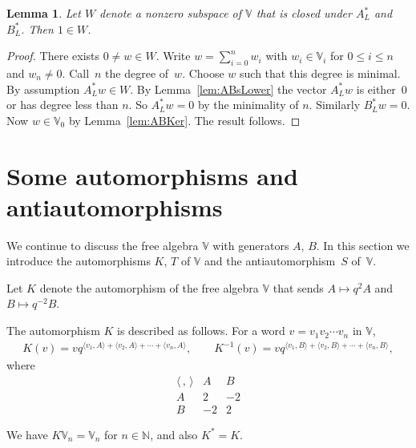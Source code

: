 \documentclass[11pt]{article}
\numberwithin{equation}{section}
\numberwithin{equation}{section}
\newtheorem{Lemma}[Theorem]{Lemma}
\begin{document}
{\begin{Lemma}\label{lem:ABirred}
Let $W$ denote a nonzero subspace of $\mathbb V$ that is closed under
$A^*_L$ and $B^*_L$. Then $1 \in W$.
\end{Lemma}
\begin{proof} There exists $0 \not=w \in W$. Write $w = \sum\limits_{i=0}^n w_i$ with $w_i \in \mathbb V_i$ for $0 \leq i \leq n$ and $w_n \not=0$. Call~$n$ the degree of~$w$. Choose $w$ such that this degree is minimal. By assumption $A^*_L w \in W$. By Lemma~\ref{lem:ABsLower} the vector
$A^*_Lw$ is either~0 or has degree less than $n$. So $A^*_Lw=0$ by the minimality of $n$.
Similarly $B^*_Lw=0$. Now $w \in \mathbb V_0$ by Lemma~\ref{lem:ABKer}. The result follows.
\end{proof}

\section{Some automorphisms and antiautomorphisms}\label{section5}

We continue to discuss the free algebra $\mathbb V$ with generators $A$, $B$. In this section we introduce
the automorphisms $K$, $T$ of $\mathbb V$ and the antiautomorphism~$S$ of~$\mathbb V$.
\begin{Definition}\label{def:Kdef} Let $K$ denote the automorphism of the free algebra $\mathbb V$
that sends $A\mapsto q^2 A$ and $B\mapsto q^{-2}B$.
\end{Definition}

The automorphism $K$ is described as follows. For a word $v=v_1 v_2 \cdots v_n$ in $\mathbb V$,
\begin{gather*}
K(v) =v q^{\langle v_1, A\rangle+
\langle v_2, A\rangle+ \cdots+
\langle v_n, A\rangle},
\qquad
K^{-1}(v) =
v q^{\langle v_1, B\rangle+
\langle v_2, B\rangle+ \cdots+
\langle v_n, B\rangle
},
\end{gather*}
where
\[
\begin{array}{c|cc}
\langle\,,\,\rangle & A & B
 \\ \hline
A &2 & -2 \\
B & -2 & 2
 \end{array}
\]

We have $K\mathbb V_n = \mathbb V_n $ for $n \in \mathbb N$, and also $K^*=K$.

}
\end{document}
